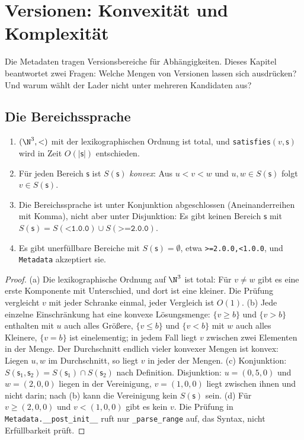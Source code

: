 \chapter{Versionen: Konvexität und Komplexität}
\label{chap:versionen}

Die Metadaten tragen Versionsbereiche für Abhängigkeiten. Dieses Kapitel beantwortet zwei Fragen: Welche Mengen von Versionen lassen sich ausdrücken? Und warum wählt der Lader nicht unter mehreren Kandidaten aus?

\section{Die Bereichssprache}

\begin{satz}
	\label{satz:konvex}
	\begin{enumerate}[label=(\alph*)]
		\item $(\N^3,<)$ mit der lexikographischen Ordnung ist total, und \texttt{satisfies}$(v,\mathsf{s})$ wird in Zeit $O(|\mathsf{s}|)$ entschieden.
		\item Für jeden Bereich $\mathsf{s}$ ist $S(\mathsf{s})$ \emph{konvex}: Aus $u<v<w$ und $u,w\in S(\mathsf{s})$ folgt $v\in S(\mathsf{s})$.
		\item Die Bereichssprache ist unter Konjunktion abgeschlossen (Aneinanderreihen mit Komma), nicht aber unter Disjunktion: Es gibt keinen Bereich $\mathsf{s}$ mit $S(\mathsf{s})=S(\texttt{<1.0.0})\cup S(\texttt{>=2.0.0})$.
		\item Es gibt unerfüllbare Bereiche mit $S(\mathsf{s})=\emptyset$, etwa \texttt{>=2.0.0,<1.0.0}, und \texttt{Metadata} akzeptiert sie.
	\end{enumerate}
\end{satz}

\begin{proof}
	(a) Die lexikographische Ordnung auf $\N^3$ ist total: Für $v\ne w$ gibt es eine erste Komponente mit Unterschied, und dort ist eine kleiner. Die Prüfung vergleicht $v$ mit jeder Schranke einmal, jeder Vergleich ist $O(1)$.
	(b) Jede einzelne Einschränkung hat eine konvexe Lösungsmenge: $\{v\ge b\}$ und $\{v>b\}$ enthalten mit $u$ auch alles Größere, $\{v\le b\}$ und $\{v<b\}$ mit $w$ auch alles Kleinere, $\{v=b\}$ ist einelementig; in jedem Fall liegt $v$ zwischen zwei Elementen in der Menge. Der Durchschnitt endlich vieler konvexer Mengen ist konvex: Liegen $u,w$ im Durchschnitt, so liegt $v$ in jeder der Mengen.
	(c) Konjunktion: $S(\mathsf{s}_1,\mathsf{s}_2)=S(\mathsf{s}_1)\cap S(\mathsf{s}_2)$ nach Definition. Disjunktion: $u=(0,5,0)$ und $w=(2,0,0)$ liegen in der Vereinigung, $v=(1,0,0)$ liegt zwischen ihnen und nicht darin; nach (b) kann die Vereinigung kein $S(\mathsf{s})$ sein.
	(d) Für $v\ge(2,0,0)$ und $v<(1,0,0)$ gibt es kein $v$. Die Prüfung in \texttt{Metadata.\_\_post\_init\_\_} ruft nur \texttt{\_parse\_range} auf, das Syntax, nicht Erfüllbarkeit prüft.
\end{proof}

